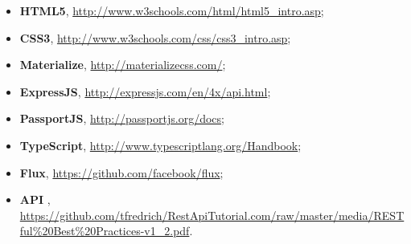 \begin{itemize}
\item \textbf{HTML5}, \url{http://www.w3schools.com/html/html5\_intro.asp};
\item \textbf{CSS3}, \url{http://www.w3schools.com/css/css3\_intro.asp};
\item \textbf{Materialize}, \url{http://materializecss.com/};
\item \textbf{ExpressJS}, \url{http://expressjs.com/en/4x/api.html};
\item \textbf{PassportJS}, \url{http://passportjs.org/docs};
\item \textbf{TypeScript}, \url{http://www.typescriptlang.org/Handbook};
\item \textbf{Flux}, \url{https://github.com/facebook/flux};
\item \textbf{API }, \url{https://github.com/tfredrich/RestApiTutorial.com/raw/master/media/RESTful\%20Best\%20Practices-v1\_2.pdf}.
\end{itemize}
